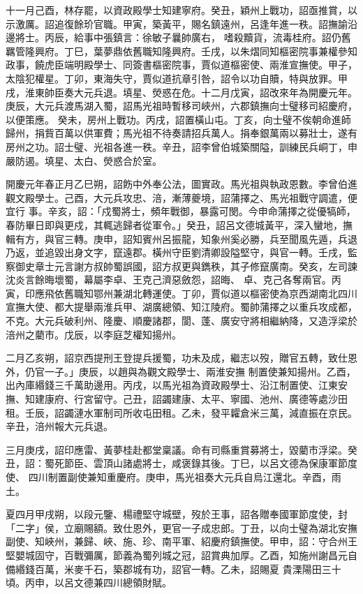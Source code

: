 \begin{pinyinscope}
 十一月己酉，林存罷，以資政殿學士知建寧府。癸丑，穎州上戰功，詔亟推賞，以示激厲。詔追復餘玠官職。甲寅，築黃平，賜名鎮遠州，呂逢年進一秩。詔撫諭沿邊將士。丙辰，給事中張鎮言：徐敏子曩帥廣右，
 嗜殺黷貨，流毒桂府。詔仍舊羈管隆興府。丁巳，葉夢鼎依舊職知隆興府。壬戌，以朱熠同知樞密院事兼權參知政事，饒虎臣端明殿學士、同簽書樞密院事，賈似道樞密使、兩淮宣撫使。甲子，太陰犯權星。丁卯，東海失守，賈似道抗章引咎，詔令以功自贖，特與放罪。甲戌，淮東帥臣奏大元兵退。填星、熒惑在危。十二月戊寅，詔改來年為開慶元年。庚辰，大元兵渡馬湖入蜀，詔馬光祖時暫移司峽州，六郡鎮撫向士璧移司紹慶府，以便策應。
 癸未，房州上戰功。丙戌，詔置橫山屯。丁亥，向士璧不俟朝命進師歸州，捐貲百萬以供軍費；馬光祖不待奏請招兵萬人。捐奉銀萬兩以募壯士，遂有房州之功。詔士璧、光祖各進一秩。辛丑，詔李曾伯城築關隘，訓練民兵峒丁，申嚴防遏。填星、太白、熒惑合於室。



 開慶元年春正月乙巳朔，詔飭中外奉公法，圖實政。馬光祖與執政恩數。李曾伯進觀文殿學士。己酉，大元兵攻忠、涪，漸薄夔境，詔蒲擇之、馬光祖戰守調遣，便宜行
 事。辛亥，詔：「戍蜀將士，頻年戰御，暴露可閔。今申命蒲擇之從優犒師，春防畢日即與更戍，其輒逃歸者從軍令。」癸丑，詔呂文德城黃平，深入蠻地，撫輯有方，與官三轉。庚申，詔知賓州呂振龍，知象州奚必勝，兵至聞風先遁，兵退乃返，並追毀出身文字，竄遠郡。橫州守臣劉清卿設隘堅守，與官一轉。壬戌，監察御史章士元言謝方叔帥蜀誤國，詔方叔更與鐫秩，其子修竄廣南。癸亥，左司諫沈炎言餘晦壞蜀，幕屬李卓、王克己濟惡斂怨，詔晦、
 卓、克己各奪兩官。丙寅，印應飛依舊職知鄂州兼湖北轉運使。丁卯，賈似道以樞密使為京西湖南北四川宣撫大使、都大提舉兩淮兵甲、湖廣總領、知江陵府。蜀帥蒲擇之以重兵攻成都，不克。大元兵破利州、隆慶、順慶諸郡，閬、蓬、廣安守將相繼納降，又造浮梁於涪州之藺市。戊辰，以李庭芝權知揚州。



 二月乙亥朔，詔京西提刑王登提兵援蜀，功未及成，繼志以歿，贈官五轉，致仕恩外，仍官一子。」庚辰，以趙與為觀文殿學士、兩淮安撫
 制置使兼知揚州。乙酉，出內庫緡錢三千萬助邊用。丙戌，以馬光祖為資政殿學士、沿江制置使、江東安撫、知建康府、行宮留守。己丑，詔蠲建康、太平、寧國、池州、廣德等處沙田租。壬辰，詔蠲漣水軍制司所收屯田租。乙未，發平糶倉米三萬，減直振在京民。辛丑，涪州報大元兵退。



 三月庚戌，詔印應雷、黃夢桂赴都堂稟議。命有司縣重賞募將士，毀藺市浮梁。癸丑，詔：蜀死節臣、雲頂山諸處將士，咸褒錄其後。丁巳，以呂文德為保康軍節度使、
 四川制置副使兼知重慶府。庚申，馬光祖奏大元兵自烏江還北。辛酉，雨土。



 夏四月甲戌朔，以段元鑒、楊禮堅守城壁，歿於王事，詔各贈奉國軍節度使，封「二字」侯，立廟賜額。致仕恩外，更官一子成忠郎。丁丑，以向士璧為湖北安撫副使、知峽州，兼歸、峽、施、珍、南平軍、紹慶府鎮撫使。甲申，詔：守合州王堅嬰城固守，百戰彌厲，節義為蜀列城之冠，詔賞典加厚。乙酉，知施州謝昌元自備緡錢百萬，米麥千石，築郡城有功，詔官一轉。乙未，詔賜夏
 貴溧陽田三十頃。丙申，以呂文德兼四川總領財賦。




\end{pinyinscope}

